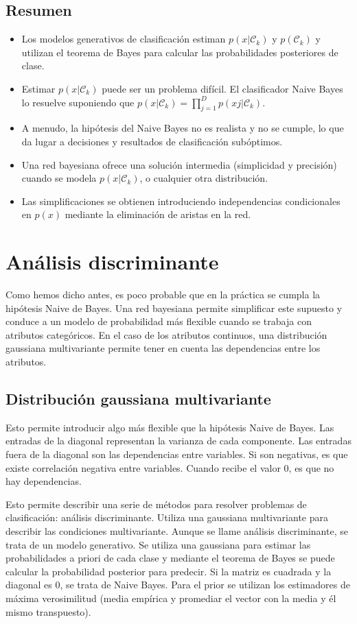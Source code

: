 \subsection{Resumen}
\begin{itemize}
\item Los modelos generativos de clasificación estiman $p(x|\mathcal{C}_k )$ y $p(\mathcal{C}_k )$ y utilizan el teorema de Bayes para calcular las probabilidades posteriores de clase.
\item Estimar $p(x|\mathcal{C}_k )$ puede ser un problema difícil. El clasificador Naive Bayes lo resuelve suponiendo que $p(x|\mathcal{C}_k ) = \prod^D_{j=1} p(xj |\mathcal{C}_k )$.
\item A menudo, la hipótesis del Naive Bayes no es realista y no se cumple, lo que da lugar a decisiones y resultados de clasificación subóptimos.
\item Una red bayesiana ofrece una solución intermedia (simplicidad y precisión) cuando se modela $p(x|\mathcal{C}_k )$, o cualquier otra distribución.
\item Las simplificaciones se obtienen introduciendo independencias condicionales en $p(x)$ mediante la eliminación de aristas en la red.
\end{itemize}

\section{Análisis discriminante}
Como hemos dicho antes, es poco probable que en la práctica se cumpla la hipótesis Naive de Bayes. Una red bayesiana permite simplificar este supuesto y conduce a un modelo de probabilidad más flexible cuando se trabaja con atributos categóricos. En el caso de los atributos continuos, una distribución gaussiana multivariante permite tener en cuenta las dependencias entre los atributos.

\subsection{Distribución gaussiana multivariante}
Esto permite introducir algo más flexible que la hipótesis Naive de Bayes. Las entradas de la diagonal representan la varianza de cada componente. Las entradas fuera de la diagonal son las dependencias entre variables. Si son negativas, es que existe correlación negativa entre variables. Cuando recibe el valor 0, es que no hay dependencias. 

Esto permite describir una serie de métodos para resolver problemas de clasificación: análisis discriminante. Utiliza una gaussiana multivariante para describir las condiciones multivariante. Aunque se llame análisis discriminante, se trata de un modelo generativo. Se utiliza una gaussiana para estimar las probabilidades a priori de cada clase y mediante el teorema de Bayes se puede calcular la probabilidad posterior para predecir. Si la matriz es cuadrada y la diagonal es 0, se trata de Naive Bayes. Para el prior se utilizan los estimadores de máxima verosimilitud (media empírica y promediar el vector con la media y él mismo transpuesto). 

